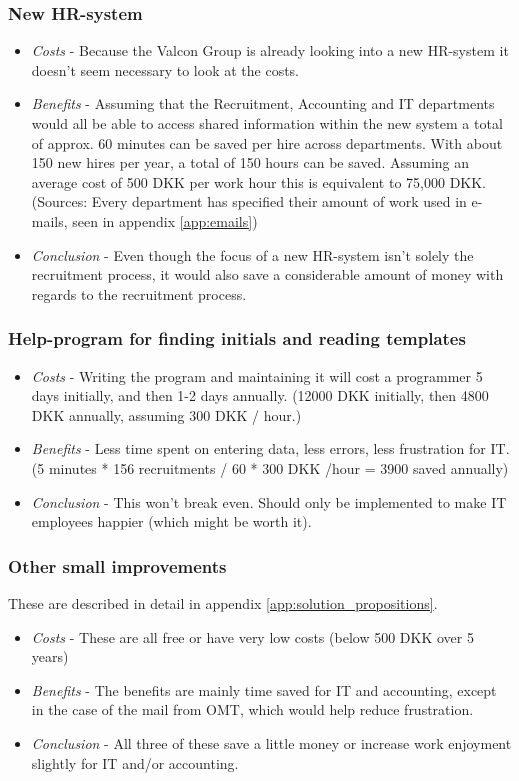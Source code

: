 \subsubsection{New HR-system}
\begin{itemize}
	\item \emph{Costs} - Because the Valcon Group is already looking into a new HR-system it doesn't seem necessary to look at the costs.
	\item \emph{Benefits} - Assuming that the Recruitment, Accounting and IT departments would all be able to access shared information within the new system a total of approx. 60 minutes can be saved per hire across departments. With about 150 new hires per year, a total of 150 hours can be saved. Assuming an average cost of 500 DKK per work hour this is equivalent to 75,000 DKK. (Sources: Every department has specified their amount of work used in e-mails, seen in appendix \ref{app:emails})
	\item \emph{Conclusion} - Even though the focus of a new HR-system isn't solely the recruitment process, it would also save a considerable amount of money with regards to the recruitment process.
\end{itemize}

\subsubsection{Help-program for finding initials and reading templates}
\begin{itemize}
	\item \emph{Costs} - Writing the program and maintaining it will cost a programmer 5 days initially, and then 1-2 days annually. (12000 DKK initially, then 4800 DKK annually, assuming 300 DKK / hour.)
	\item \emph{Benefits} - Less time spent on entering data, less errors, less frustration for IT. (5 minutes * 156 recruitments / 60 * 300 DKK /hour = 3900 saved annually)
	\item \emph{Conclusion} - This won't break even. Should only be implemented to make IT employees happier (which might be worth it).
\end{itemize}

\subsubsection{Other small improvements}
These are described in detail in appendix \ref{app:solution_propositions}.
\begin{itemize}
	\item \emph{Costs} - These are all free or have very low costs (below 500 DKK over 5 years)
	\item \emph{Benefits} - The benefits are mainly time saved for IT and accounting, except in the case of the mail from OMT, which would help reduce frustration.
	\item \emph{Conclusion} - All three of these save a little money or increase work enjoyment slightly for IT and/or accounting.
\end{itemize}